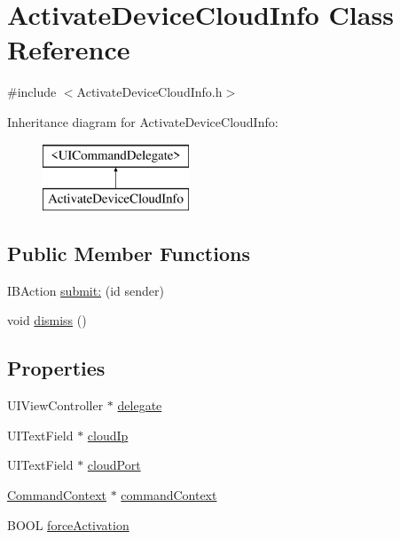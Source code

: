 \hypertarget{interface_activate_device_cloud_info}{
\section{\-Activate\-Device\-Cloud\-Info \-Class \-Reference}
\label{interface_activate_device_cloud_info}
}


{\ttfamily \#include $<$\-Activate\-Device\-Cloud\-Info.\-h$>$}

\-Inheritance diagram for \-Activate\-Device\-Cloud\-Info\-:\begin{figure}[H]
\begin{center}
\leavevmode
\includegraphics[height=2.000000cm]{interface_activate_device_cloud_info}
\end{center}
\end{figure}
\subsection*{\-Public \-Member \-Functions}
\begin{DoxyCompactItemize}
\item 
\-I\-B\-Action \hyperlink{interface_activate_device_cloud_info_af439795da5a7cfc55383de11b6ffbe3d}{submit\-:} (id sender)
\item 
void \hyperlink{interface_activate_device_cloud_info_a459418e389b308476d1fb1a099f9dc04}{dismiss} ()
\end{DoxyCompactItemize}
\subsection*{\-Properties}
\begin{DoxyCompactItemize}
\item 
\-U\-I\-View\-Controller $\ast$ \hyperlink{interface_activate_device_cloud_info_a356873d34a829b2cffcf5478c318c4aa}{delegate}
\item 
\-U\-I\-Text\-Field $\ast$ \hyperlink{interface_activate_device_cloud_info_a7bc7c83d7fc4eda7613759c2b2c39277}{cloud\-Ip}
\item 
\-U\-I\-Text\-Field $\ast$ \hyperlink{interface_activate_device_cloud_info_ae76ab10b1fe9414ba7eca3cbddcf7e13}{cloud\-Port}
\item 
\hyperlink{interface_command_context}{\-Command\-Context} $\ast$ \hyperlink{interface_activate_device_cloud_info_a3518bd82ee2bf49007b147ad38fbac96}{command\-Context}
\item 
\-B\-O\-O\-L \hyperlink{interface_activate_device_cloud_info_a1684a039a9a51efe1cb915f9557b1f73}{force\-Activation}
\end{DoxyCompactItemize}



